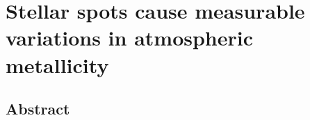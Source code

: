 \newcommand\project[1]{\textsl{#1}}
\newcommand\software[1]{\textsc{#1}}
\newcommand\corot{\project{CoRoT}}
\newcommand\kepler{\project{Kepler}}

\newcommand\tess{\project{TESS}}
\newcommand\PLATO{\project{PLATO}}

\newcommand\MESA{\software{MESA}}
\newcommand\ADIPLS{\software{ADIPLS}}
\newcommand\pymc{\software{PyMC3}}
\newcommand\python{\software{Python}}
\newcommand\numdifftools{\software{numdifftools}}
\newcommand\numpy{\software{NumPy}}
\newcommand\scipy{\software{SciPy}}

\newcommand{\matr}[1]{\mathbf{#1}}
\newcommand{\vect}[1]{\overrightarrow{\vec{#1}}}

\newcommand{\ilya}[1]{\textcolor{red}{#1}}
\newcommand{\tw}[1]{\textcolor{black}{#1}}
\newcommand{\Add}[1]{\textbf{#1}}
\newcommand{\Del}[1]{}
\newcommand{\Chng}[2]{\Del{#1} \Add{#2}}
\newcommand{\tamb}{$T_{\text{amb}}$}
\newcommand{\tspot}{$T_{\text{spot}}$}
\newcommand{\xspot}{$x_{\text{spot}}$}
\newcommand{\fspot}{$f_{\text{spot}}$}
\newcommand{\teff}{$T_{\text{eff}}$}
\newcommand{\vsini}{$v \sin{i}$}
\newcommand{\logg}{$\log{g}$}
\newcommand{\deltafe}{$\Delta$[Fe/H]}

\newcommand{\todo}[1]{\textcolor{red}{#1}}

\usepackage{xcolor} 
\newcommand{\arcHighlight}[1]{#1}
\newcommand{\CitationNeeded}{\textcolor{red}{[citation needed]}}


\chapter{Stellar spots cause measurable variations in atmospheric metallicity}
\label{chap:stellar_spots}
\section*{Abstract}

